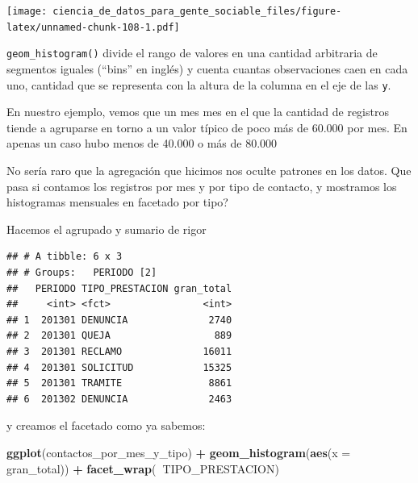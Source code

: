 \documentclass[spanish,]{book}
\newenvironment{Shaded}{\begin{snugshade}}{\end{snugshade}}
\newcommand{\DataTypeTok}[1]{\textcolor[rgb]{0.13,0.29,0.53}{#1}}
\newcommand{\KeywordTok}[1]{\textcolor[rgb]{0.13,0.29,0.53}{\textbf{#1}}}
\newcommand{\NormalTok}[1]{#1}
\newcommand{\OperatorTok}[1]{\textcolor[rgb]{0.81,0.36,0.00}{\textbf{#1}}}
\newcommand{\StringTok}[1]{\textcolor[rgb]{0.31,0.60,0.02}{#1}}
\begin{document}
\texttt{[image: ciencia\_de\_datos\_para\_gente\_sociable\_files/figure-latex/unnamed-chunk-108-1.pdf]}

\texttt{geom\_histogram()} divide el rango de valores en una cantidad arbitraria de segmentos iguales (``bins'' en inglés) y cuenta cuantas observaciones caen en cada uno, cantidad que se representa con la altura de la columna en el eje de las \texttt{y}.

En nuestro ejemplo, vemos que un mes mes en el que la cantidad de registros tiende a agruparse en torno a un valor típico de poco más de 60.000 por mes. En apenas un caso hubo menos de 40.000 o más de 80.000

No sería raro que la agregación que hicimos nos oculte patrones en los datos. Que pasa si contamos los registros por mes y por tipo de contacto, y mostramos los histogramas mensuales en facetado por tipo?

Hacemos el agrupado y sumario de rigor

\begin{Shaded}
\end{Shaded}

\begin{verbatim}
## # A tibble: 6 x 3
## # Groups:   PERIODO [2]
##   PERIODO TIPO_PRESTACION gran_total
##     <int> <fct>                <int>
## 1  201301 DENUNCIA              2740
## 2  201301 QUEJA                  889
## 3  201301 RECLAMO              16011
## 4  201301 SOLICITUD            15325
## 5  201301 TRAMITE               8861
## 6  201302 DENUNCIA              2463
\end{verbatim}

y creamos el facetado como ya sabemos:

\begin{Shaded}
\begin{Highlighting}[]
\KeywordTok{ggplot}\NormalTok{(contactos_por_mes_y_tipo) }\OperatorTok{+}\StringTok{ }
\StringTok{    }\KeywordTok{geom_histogram}\NormalTok{(}\KeywordTok{aes}\NormalTok{(}\DataTypeTok{x =}\NormalTok{ gran_total)) }\OperatorTok{+}
\StringTok{    }\KeywordTok{facet_wrap}\NormalTok{(}\OperatorTok{~}\NormalTok{TIPO_PRESTACION)}
\end{Highlighting}
\end{Shaded}
\end{document}
